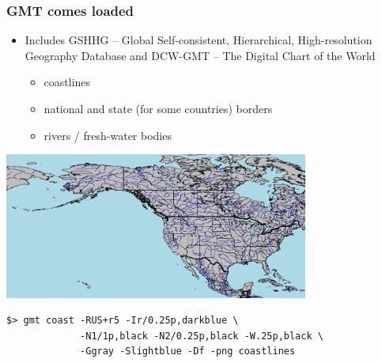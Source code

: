 \documentclass[unknownkeysallowed]{beamer}
\begin{document}
\begin{frame}[fragile=singleslide]
\frametitle{GMT comes loaded}
	\begin{itemize}
		\item Includes GSHHG -- Global Self-consistent, Hierarchical, High-resolution Geography Database and DCW-GMT -- The Digital Chart of the World
		\begin{itemize}	
			\item coastlines
			\item national and state (for some countries) borders
			\item rivers / fresh-water bodies
		\end{itemize}
	\end{itemize}

	\begin{center}
		\includegraphics[width=0.75\textwidth]{../figures/gmt_coastlines.png}	
	\end{center}
	{\scriptsize	
	\begin{verbatim}
$> gmt coast -RUS+r5 -Ir/0.25p,darkblue \
             -N1/1p,black -N2/0.25p,black -W.25p,black \
             -Ggray -Slightblue -Df -png coastlines 
	\end{verbatim}
	}

\end{frame}
\end{document}
